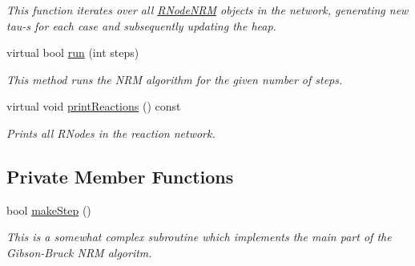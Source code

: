 \begin{DoxyCompactItemize}
\begin{DoxyCompactList}\small\item\em This function iterates over all \hyperlink{classchem_1_1RNodeNRM}{R\-Node\-N\-R\-M} objects in the network, generating new tau-\/s for each case and subsequently updating the heap. \end{DoxyCompactList}\item 
virtual bool \hyperlink{classchem_1_1ChemNRMImpl_a236b68389599aa9486959377cfc51496}{run} (int steps)
\begin{DoxyCompactList}\small\item\em This method runs the N\-R\-M algorithm for the given number of steps. \end{DoxyCompactList}\item 
virtual void \hyperlink{classchem_1_1ChemNRMImpl_a7898a5e226789a39b51f8fb56cc85c1e}{print\-Reactions} () const 
\begin{DoxyCompactList}\small\item\em Prints all R\-Nodes in the reaction network. \end{DoxyCompactList}\end{DoxyCompactItemize}
\subsection*{Private Member Functions}
\begin{DoxyCompactItemize}
\item 
bool \hyperlink{classchem_1_1ChemNRMImpl_a9f17d2b5953fd3ffc8b5337e78021ed2}{make\-Step} ()
\begin{DoxyCompactList}\small\item\em This is a somewhat complex subroutine which implements the main part of the Gibson-\/\-Bruck N\-R\-M algoritm. \end{DoxyCompactList}\end{DoxyCompactItemize}
